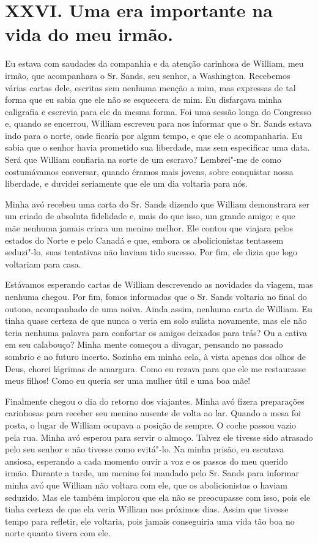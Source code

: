 \chapter{XXVI. Uma era importante na vida do meu
irmão.}

Eu estava com saudades da companhia e
da atenção carinhosa de William, meu irmão, que acompanhara o Sr. Sands,
seu senhor, a Washington. Recebemos várias cartas dele, escritas sem
nenhuma menção a mim, mas expressas de tal forma que eu sabia que ele
não se esquecera de mim. Eu disfarçava minha caligrafia e escrevia para
ele da mesma forma. Foi uma sessão longa do Congresso e, quando se
encerrou, William escreveu para nos informar que o Sr. Sands estava indo
para o norte, onde ficaria por algum tempo, e que ele o acompanharia. Eu
sabia que o senhor havia prometido sua liberdade, mas sem especificar
uma data. Será que William confiaria na sorte de um escravo? Lembrei"-me
de como costumávamos conversar, quando éramos mais jovens, sobre
conquistar nossa liberdade, e duvidei seriamente que ele um dia voltaria
para nós.

Minha avó recebeu uma carta do Sr.
Sands dizendo que William demonstrara ser um criado de absoluta
fidelidade e, mais do que isso, um grande amigo; e que mãe nenhuma
jamais criara um menino melhor. Ele contou que viajara pelos estados do
Norte e pelo Canadá e que, embora os abolicionistas tentassem seduzi"-lo,
suas tentativas não haviam tido sucesso. Por fim, ele dizia que logo
voltariam para casa.

Estávamos esperando cartas de William
descrevendo as novidades da viagem, mas nenhuma chegou. Por fim, fomos
informadas que o Sr. Sands voltaria no final do outono, acompanhado de
uma noiva. Ainda assim, nenhuma carta de William. Eu tinha quase certeza
de que nunca o veria em solo sulista novamente, mas ele não teria
nenhuma palavra para confortar os amigos deixados para trás? Ou a cativa
em seu calabouço? Minha mente começou a divagar, pensando no passado
sombrio e no futuro incerto. Sozinha em minha cela, à vista apenas dos
olhos de Deus, chorei lágrimas de amargura. Como eu rezava para que ele
me restaurasse meus filhos! Como eu queria ser uma mulher útil e uma boa
mãe!

Finalmente chegou o dia do retorno dos
viajantes. Minha avó fizera preparações carinhosas para receber seu
menino ausente de volta ao lar. Quando a mesa foi posta, o lugar de
William ocupava a posição de sempre. O coche passou vazio pela rua.
Minha avó esperou para servir o almoço. Talvez ele tivesse sido atrasado
pelo seu senhor e não tivesse como evitá"-lo. Na minha prisão, eu
escutava ansiosa, esperando a cada momento ouvir a voz e os passos do
meu querido irmão. Durante a tarde, um menino foi mandado pelo Sr. Sands
para informar minha avó que William não voltara com ele, que os
abolicionistas o haviam seduzido. Mas ele também implorou que ela não se
preocupasse com isso, pois ele tinha certeza de que ela veria William
nos próximos dias. Assim que tivesse tempo para refletir, ele voltaria,
pois jamais conseguiria uma vida tão boa no norte quanto tivera com ele.


